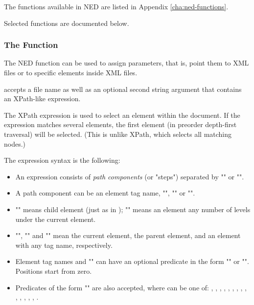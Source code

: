 The functions available in NED are listed in Appendix
\ref{cha:ned-functions}.

Selected functions are documented below.

\subsubsection{The  Function}
\label{sec:ned-ref:xmldoc-function}

The  NED function can be used to assign  parameters,
that is, point them to XML files or to specific elements inside XML files.

 accepts a file name as well as an optional second string argument
that contains an XPath-like expression.


The XPath expression is used to select an element within the document.
If the expression matches several elements, the first element
(in preorder depth-first traversal) will be selected. (This is
unlike XPath, which selects all matching nodes.)

The expression syntax is the following:
\begin{itemize}
  \item An expression consists of \textit{path components} (or "steps")
        separated by "\ttt{/}" or "\ttt{//}".
  \item A path component can be an element tag name, "\ttt{*}", ""
        or "".
  \item "\ttt{/}" means child element (just as in );
        "\ttt{//}" means an element any number of levels under the current element.
  \item "", "" and "\ttt{*}" mean the current element,
        the parent element, and an element with any tag name, respectively.
  \item Element tag names and "\ttt{*}" can have an optional predicate
        in the form "\ttt{[position]}" or "\ttt{[@attribute='value']}".
        Positions start from zero.
  \item Predicates of the form "\ttt{[@attribute=\textit{\$param}]}" are also
        accepted, where  can be one of:
        ,
        ,
        ,
        ,
        ,
        ,
        ,
        ,
        ,
        ,
        ,
        ,
        ,
        ,
        .
\end{itemize}

